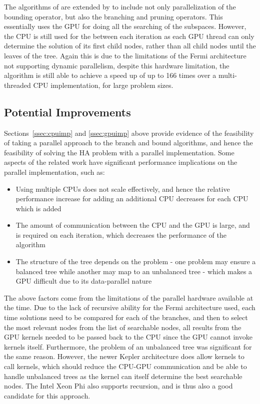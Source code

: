 \documentclass[10pt,twocolumn]{witseiepaper}
\begin{document}
The algorithms of \cite{melab:2012, chakroun:2012} are extended by \cite{chakroun:2013} to 
include not only parallelization of the bounding operator, but also the branching and pruning operators. This
essentially uses the GPU for doing all the searching of the subspaces. However, the CPU is still used for the
between each iteration as each GPU thread can only determine the solution of its first child nodes, rather 
than all child nodes until the leaves of the tree. Again this is due to the limitations of the Fermi 
architecture not supporting dynamic parallelism, despite this hardware limitation, the algorithm is still able
to achieve a speed up of up to 166 times over a multi-threaded CPU implementation, for large problem sizes.

\subsection{ Potential Improvements }

Sections~\ref{ssec:cpuimp} and \ref{ssec:gpuimp} above provide evidence of the feasibility of taking a
parallel approach to the branch and bound algorithms, and hence the feasibility of solving the HA problem with
a parallel implementation. Some aspects of the related work have significant performance implications on the
parallel implementation, such as:

\begin{itemize}
\item{ Using multiple CPUs does not scale effectively, and hence the relative performance increase for
    adding an additional CPU decreases for each CPU which is added
}
\item{ The amount of communication between the CPU and the GPU is large, and is required on each
        iteration, which decreases the performance of the algorithm
}
\item{ The structure of the tree depends on the problem - one problem may ensure a balanced tree while
        another may map to an unbalanced tree - which makes a GPU difficult due to its data-parallel
        nature
}
\end{itemize}

The above factors come from the limitations of the parallel hardware available at the time. Due to the lack of
recursive ability for the Fermi architecture used, each time solutions need to be compared for each of the
branches, and then to select the most relevant nodes from the list of searchable nodes, all results from the
GPU kernels needed to be passed back to the CPU since the GPU cannot invoke kernels itself. Furthermore, the 
problem of an unbalanced tree was significant for the same reason. However, the newer Kepler architecture does
allow kernels to call kernels, which should reduce the CPU-GPU communication and be able to handle unbalanced
trees as the kernel can itself determine the best searchable nodes. The Intel Xeon Phi also supports
recursion, and is thus also a good candidate for this approach.
\end{document}
